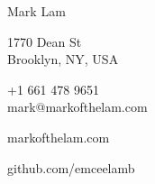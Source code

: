 \documentclass[10pt, a4paper]{article}
\begin{document}
{\LARGE Mark Lam}\\[.2cm]
\begin{multicols}{2}
  1770 Dean St\\
  Brooklyn, NY, USA\\

  \vspace{-10pt}

  +1 661 478 9651\\
  mark@markofthelam.com\\
  \columnbreak

  markofthelam.com

  github.com/emceelamb
\end{multicols}
\end{document}
